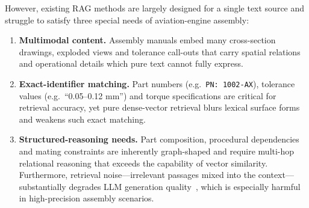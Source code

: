 \documentclass[applsci,article,submit,pdftex,moreauthors]{Definitions/mdpi}
\begin{document}
However, existing RAG methods are largely designed for a single text source and struggle to satisfy three special needs of aviation-engine assembly:

\begin{enumerate}
\item \textbf{Multimodal content.} Assembly manuals embed many cross-section drawings, exploded views and tolerance call-outs that carry spatial relations and operational details which pure text cannot fully express.
\item \textbf{Exact-identifier matching.} Part numbers (e.g.\ \texttt{PN: 1002-AX}), tolerance values (e.g.\ ``0.05--0.12 mm'') and torque specifications are critical for retrieval accuracy, yet pure dense-vector retrieval blurs lexical surface forms and weakens such exact matching.
\item \textbf{Structured-reasoning needs.} Part composition, procedural dependencies and mating constraints are inherently graph-shaped and require multi-hop relational reasoning that exceeds the capability of vector similarity. Furthermore, retrieval noise---irrelevant passages mixed into the context---substantially degrades LLM generation quality~\citep{liu2023lostinmiddle}, which is especially harmful in high-precision assembly scenarios.
\end{enumerate}
\end{document}
